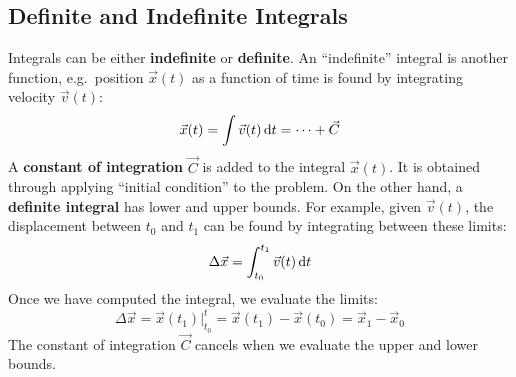 \documentclass{../../oss-handout}
\begin{document}
\subsection{Definite and Indefinite Integrals}
Integrals can be either \textbf{indefinite} or \textbf{definite}. An
``indefinite'' integral is another function, e.g.\ position $\vec x(t)$ as a
function of time is found by integrating velocity $\vec v(t)$:
\begin{equation*}
  \vec x(t)=\int\vec v(t)\dl t=\cdots+\vec C
\end{equation*}
A \textbf{constant of integration} $\vec C$ is added to the integral
$\vec x(t)$. It is obtained through applying ``initial condition'' to the
problem. On the other hand, a \textbf{definite integral} has lower and upper
bounds. For example, given $\vec v(t)$, the displacement between $t_0$ and
$t_1$ can be found by integrating between these limits:
\begin{equation*}
  \Delta\vec x=\int_{t_0}^{t_1} \vec v(t)\dl t
\end{equation*}
Once we have computed the integral, we evaluate the limits:
\begin{equation*}
  \Delta\vec x =
  \vec x(t_1)\Big|^t_{t_0}=
  \vec x(t_1)-\vec x(t_0)=
  \vec x_1-\vec x_0
\end{equation*}
The constant of integration $\vec C$ cancels when we evaluate the upper and
lower bounds.
\end{document}
